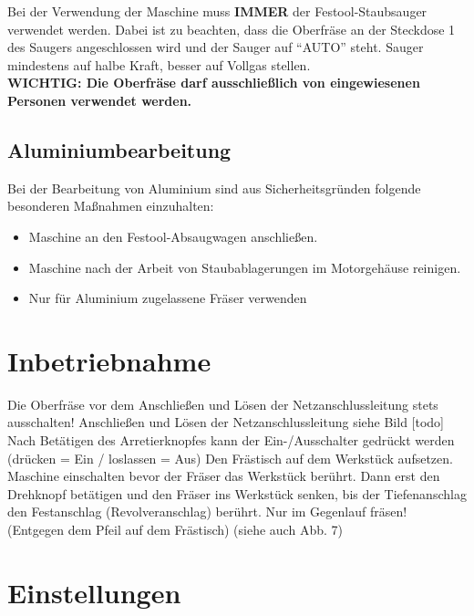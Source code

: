 \documentclass{\basedir/fablab-document}
\begin{document}
Bei der Verwendung der Maschine muss \textbf{IMMER} der Festool-Staubsauger verwendet werden. Dabei ist zu beachten, dass die Oberfräse an der Steckdose 1 des Saugers angeschlossen wird und der Sauger auf \enquote{AUTO} steht. Sauger mindestens auf halbe Kraft, besser auf Vollgas stellen.\\

\textbf{WICHTIG: Die Oberfräse darf ausschließlich von eingewiesenen Personen verwendet werden.}


\subsection{Aluminiumbearbeitung}
Bei der Bearbeitung von Aluminium sind aus Sicherheitsgründen folgende besonderen Maßnahmen einzuhalten:
\begin{itemize}
\item Maschine an den Festool-Absaugwagen anschließen.
\item Maschine nach der Arbeit von Staubablagerungen im Motorgehäuse reinigen.
\item Nur für Aluminium zugelassene Fräser verwenden
\end{itemize}


\section{Inbetriebnahme}
Die Oberfräse vor dem Anschließen und Lösen der Netzanschlussleitung stets ausschalten! Anschließen und Lösen der Netzanschlussleitung siehe Bild [todo]
Nach Betätigen des Arretierknopfes kann der Ein-/Ausschalter gedrückt werden (drücken = Ein / loslassen = Aus)
Den Frästisch auf dem Werkstück aufsetzen. Maschine einschalten bevor der Fräser das Werkstück berührt. Dann erst den Drehknopf betätigen und den Fräser ins Werkstück senken, bis der Tiefenanschlag den Festanschlag (Revolveranschlag) berührt. 
Nur im Gegenlauf fräsen! (Entgegen dem Pfeil auf dem Frästisch) (siehe auch Abb. 7)


\section{Einstellungen}
\end{document}
